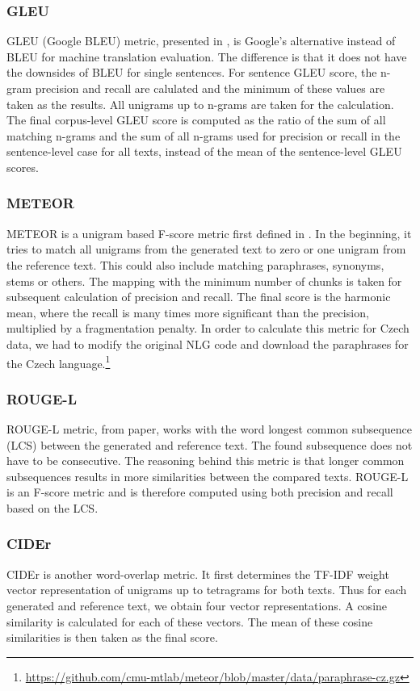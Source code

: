 \subsubsection*{GLEU}
GLEU (Google BLEU) metric, presented in \citet{wu2016google}, is Google's alternative instead of BLEU for machine translation evaluation. The difference is that it does not have the downsides of BLEU for single sentences. For sentence GLEU score, the n-gram precision and recall are calulated and the minimum of these values are taken as the results. All unigrams up to n-grams are taken for the calculation. The final corpus-level GLEU score is computed as the ratio of the sum of all matching n-grams and the sum of all n-grams used for precision or recall in the sentence-level case for all texts, instead of the mean of the sentence-level GLEU scores.

\subsubsection*{METEOR}
METEOR is a unigram based F-score metric first defined in \citet{banerjee2005meteor}. In the beginning, it tries to match all unigrams from the generated text to zero or one unigram from the reference text. This could also include matching paraphrases, synonyms, stems or others. The mapping with the minimum number of chunks is taken for subsequent calculation of precision and recall. The final score is the harmonic mean, where the recall is many times more significant than the precision, multiplied by a fragmentation penalty. In order to calculate this metric for Czech data, we had to modify the original NLG code and download the paraphrases for the Czech language.\footnote[1]{\url{https://github.com/cmu-mtlab/meteor/blob/master/data/paraphrase-cz.gz}}

\subsubsection*{ROUGE-L}
ROUGE-L metric, from \citet{lin2004rouge} paper, works with the word longest common subsequence (LCS) between the generated and reference text. The found subsequence does not have to be consecutive. The reasoning behind this metric is that longer common subsequences results in more similarities between the compared texts. ROUGE-L is an F-score metric and is therefore computed using both precision and recall based on the LCS.

\subsubsection*{CIDEr}
CIDEr\citep{vedantam2015cider} is another word-overlap metric. It first determines the TF-IDF weight vector representation of unigrams up to tetragrams for both texts. Thus for each generated and reference text, we obtain four vector representations. A cosine similarity is calculated for each of these vectors. The mean of these cosine similarities is then taken as the final score.

